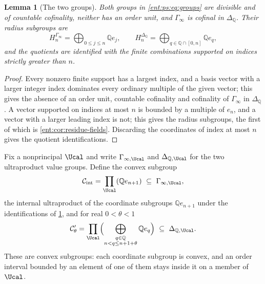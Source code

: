 \documentclass[11pt]{article}
\theoremstyle{plain}
\newtheorem{lemma}[lemma]{Lemma}
\theoremstyle{plain}
\theoremstyle{plain}
\theoremstyle{definition}
\theoremstyle{definition}
\theoremstyle{definition}
\theoremstyle{definition}
\theoremstyle{remark}
\newcommand{\Q}{\mathbb Q}\newcommand{\Z}{\mathbb Z}\newcommand{\N}{\mathbb N}
\begin{document}
\begin{lemma}[The two groups]\label{ent:ps:lem:groups}
Both groups in \eqref{ent:ps:eq:groups} are divisible and of countable
cofinality, neither has an order unit, and $\Gamma_\infty$ is cofinal in
$\Delta_\Q$. Their radius subgroups are
\[
 H_n^{\Gamma_\infty}=\bigoplus_{0\le j\le n}\Q e_j,
 \qquad
 H_n^{\Delta_\Q}=\bigoplus_{q\in\Q\cap[0,n]}\Q e_q ,
\]
and the quotients are identified with the finite combinations supported on
indices strictly greater than $n$.
\end{lemma}
\begin{proof}
Every nonzero finite support has a largest index, and a basis vector with a
larger integer index dominates every ordinary multiple of the given vector;
this gives the absence of an order unit, countable cofinality and cofinality
of $\Gamma_\infty$ in $\Delta_\Q$. A vector supported on indices at most $n$
is bounded by a multiple of $e_n$, and a vector with a larger leading index
is not; this gives the radius subgroups, the first of which is
\cref{ent:cor:residue-fields}. Discarding the coordinates of index at most
$n$ gives the quotient identifications.
\end{proof}

Fix a nonprincipal $\Ucal$ and write $\Gamma_{\infty,\Ucal}$ and
$\Delta_{\Q,\Ucal}$ for the two ultraproduct value groups. Define the convex
subgroup
\begin{equation}\label{ent:ps:eq:Cint}
 \mathcal C_{\mathrm{int}}=\prod_\Ucal(\Q e_{n+1})\ \subseteq\
 \Gamma_{\infty,\Ucal},
\end{equation}
the internal ultraproduct of the coordinate subgroups $\Q e_{n+1}$ under the
identifications of \cref{ent:ps:lem:groups}, and for real $0<\theta<1$
\begin{equation}\label{ent:ps:eq:Ctheta}
 \mathcal C'_\theta=\prod_\Ucal\Bigl(\bigoplus_{\substack{q\in\Q\\
   n<q\le n+1+\theta}}\Q e_q\Bigr)\ \subseteq\ \Delta_{\Q,\Ucal}.
\end{equation}
These are convex subgroups: each coordinate subgroup is convex, and an order
interval bounded by an element of one of them stays inside it on a member
of $\Ucal$.
\end{document}
